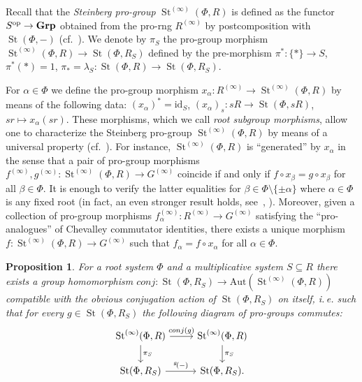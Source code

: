\documentclass[oneside, 11pt]{amsart} \pdfoutput=1
\newcommand{\St}{\mathop{\mathrm{St}}\nolimits}
\numberwithin{equation}{section}
\newtheorem{prop}[lemma]{Proposition}
\theoremstyle{definition}
\newcommand{\catname}[1]{{\normalfont\textbf{#1}}} %
\begin{document}
Recall that the {\it Steinberg pro-group} $\St^{(\infty)}(\Phi, R)$ is defined as the functor $S^\mathrm{op} \to \catname{Grp}$ obtained from the pro-rng $R^{(\infty)}$ by postcomposition with $\St(\Phi, -)$ (cf.~\cite[\S~2.4]{LSV20}). We denote by $\pi_S$ the pro-group morphism $\St^{(\infty)}(\Phi, R) \to \St(\Phi, R_S)$ defined by the pre-morphism $\pi^* \colon \{* \} \to S$, $\pi^*(*) = 1$, $\pi_{*} = \lambda_S \colon \St(\Phi, R) \to \St(\Phi, R_S)$. 

For $\alpha \in \Phi$ we define the pro-group morphism $x_\alpha \colon R^{(\infty)} \to \St^{(\infty)}(\Phi, R)$ by means of the following data: $(x_\alpha)^* = \mathrm{id}_S$, $(x_\alpha)_s \colon sR \to \St(\Phi, sR)$, $sr \mapsto x_\alpha(sr)$. These morphisms, which we call {\it root subgroup morphisms}, allow one to characterize the Steinberg pro-group $\St^{(\infty)}(\Phi, R)$ by means of a universal property (cf.~\cite[Lemma~2.16]{LSV20}). For instance, $\St^{(\infty)}(\Phi, R)$ is ``generated'' by $x_\alpha$ in the sense that a pair of pro-group morphisms $f^{(\infty)}, g^{(\infty)} \colon \St^{(\infty)}(\Phi, R) \to G^{(\infty)}$ coincide if and only if $f \circ x_\beta = g \circ x_\beta$ for all $\beta \in \Phi$.
It is enough to verify the latter equalities for $\beta \in \Phi\setminus\{\pm \alpha\}$ where $\alpha \in \Phi$ is any fixed root (in fact, an even stronger result holds, see~\cite[Lemma~3.2]{LSV20}, \cite[Lemma~11]{V20}).
Moreover, given a collection of pro-group morphisms $f_\alpha^{(\infty)} \colon R^{(\infty)} \to G^{(\infty)}$ satisfying the ``pro-analogues'' of Chevalley commutator identities, there exists a unique morphism $f \colon \St^{(\infty)}(\Phi, R) \to G^{(\infty)}$ such that $f_\alpha = f \circ x_\alpha$ for all $\alpha\in\Phi$. 
\begin{prop}\label{prop:conj-action}
 For a root system $\Phi$ and a multiplicative system $S\subseteq R$ there exists a group homomorphism $conj\colon \St(\Phi, R_S) \to \mathrm{Aut}(\St^{(\infty)}(\Phi, R))$ compatible with the obvious conjugation action of $\St(\Phi, R_S)$ on itself, i.\,e. such that for every $g \in \St(\Phi, R_S)$ the following diagram of pro-groups commutes:
 \begin{equation} \label{eq:conj-pis} \begin{tikzcd} \St^{(\infty)}(\Phi, R) \ar{r}{conj(g)} \ar{d}{\pi_S} & \St^{(\infty)}(\Phi, R) \ar{d}{\pi_S} \\ \St(\Phi, R_S) \ar{r}{{}^g\!(-)} & \St(\Phi, R_S). \end{tikzcd} \end{equation}
\end{prop}
\end{document}
